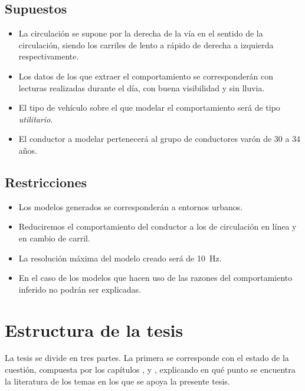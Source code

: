 \subsection{Supuestos}

\begin{itemize}
	\item La circulación se supone por la derecha de la vía en el sentido de la circulación, siendo los carriles de lento a rápido de derecha a izquierda respectivamente.
	\item Los datos de los que extraer el comportamiento se corresponderán con lecturas realizadas durante el día, con buena visibilidad y sin lluvia.
	\item El tipo de vehículo sobre el que modelar el comportamiento será de tipo \textit{utilitario}.
	\item El conductor a modelar pertenecerá al grupo de conductores varón de $30$ a $34$ años.
\end{itemize}

\subsection{Restricciones}

\begin{itemize}
	\item Los modelos generados se corresponderán a entornos urbanos.
	\item Reduciremos el comportamiento del conductor a los de circulación en línea y en cambio de carril.
	\item La resolución máxima del modelo creado será de \SI{10}{\hertz}.
	\item En el caso de los modelos que hacen uso de  las razones del comportamiento inferido no podrán ser explicadas.
\end{itemize}

\section{Estructura de la tesis}
\label{ch:intro:structure}


La tesis se divide en tres partes. La primera se corresponde con el estado de la cuestión, compuesta por los capítulos ,  y , explicando en qué punto se encuentra la literatura de los temas en los que se apoya la presente tesis.


